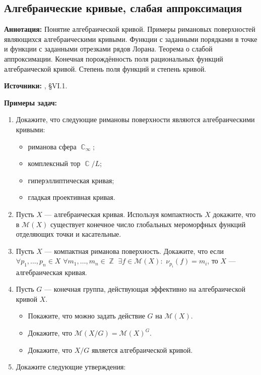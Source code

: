 \documentclass[a4paper, 12pt]{article}
\DeclareMathOperator{\ZZ}{\mathbb{Z}}
\DeclareMathOperator{\CC}{\mathbb{C}}
\begin{document}
\subsection{Алгебраические кривые, слабая аппроксимация}

{\bf Аннотация:} Понятие алгебраической кривой. Примеры римановых поверхностей являющихся алгебраическими кривыми. Функции с заданными порядками в точке и функции с заданными отрезками рядов Лорана. Теорема о слабой аппроксимации. Конечная порождённость поля рациональных функций алгебраической кривой. Степень поля функций и степень кривой.

{\bf Источники:} \cite{Mir}, \S VI.1.

{\bf Примеры задач:}
\begin{enumerate}[noitemsep,topsep=0pt]
    \item Докажите, что следующие римановы поверхности являются алгебраическими кривыми:
    \begin{itemize}[noitemsep,topsep=0pt]
        \item риманова сфера $\CC_\infty$;
        \item комплексный тор $\CC/L$;
        \item гиперэллиптическая кривая;
        \item гладкая проективная кривая.
    \end{itemize}%
    \item Пусть $X$ --- алгебраическая кривая. Используя компактность $X$ докажите, что в $\mathcal{M}(X)$ существует конечное число глобальных мероморфных функций отделяющих точки и касательные. %
    \item Пусть $X$ --- компактная риманова поверхность. Докажите, что если $\forall p_1,\dots,p_n \in X$ $\forall m_1, \dots, m_n \in\ZZ$ $\exists f\in \mathcal{M}(X):$ $\nu_{p_i}(f)=m_i$, то $X$ --- алгебраическая кривая. %
    \item Пусть $G$ --- конечная группа, действующая эффективно на алгебраической кривой $X$.
    \begin{itemize}[noitemsep,topsep=0pt]
        \item Покажите, что можно задать действие $G$ на $\mathcal{M}(X)$.
        \item Докажите, что $\mathcal{M}(X/G) = \mathcal{M}(X)^G$.
        \item Докажите, что $X/G$ является алгебраической кривой.
    \end{itemize}%
    \item Докажите следующие утверждения:

\end{enumerate}
\end{document}
